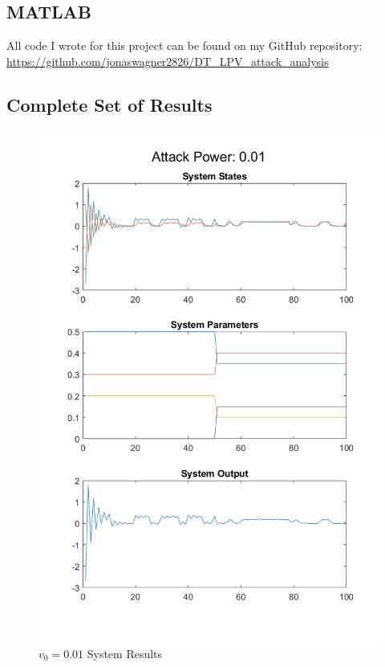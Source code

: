 \documentclass[]{ieeetran}
\begin{document}





\onecolumn
\newpage
\appendix
\subsection{MATLAB}\label{apx:MATLAB}
All code I wrote for this project can be found on my GitHub repository:\\
\href{https://github.com/jonaswagner2826/DT_LPV_attack_analysis}{https://github.com/jonaswagner2826/DT\_LPV\_attack\_analysis}\\

\newpage

\newpage

\newpage


\subsection{Complete Set of Results} \label{apx:figs}

\begin{figure}
	\centering
	\includegraphics[width=0.7\linewidth]{../../fig/SystemResponse_attack_0_01}
	\caption{$v_0 = 0.01$ System Results}
	\label{fig:systemresponseattack001}
\end{figure}
\end{document}
